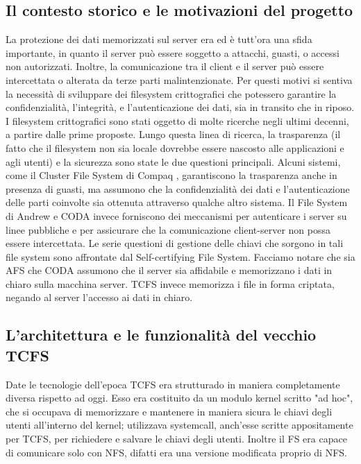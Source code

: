 \subsection{Il contesto storico e le motivazioni del progetto}
La protezione dei dati memorizzati sul server era ed è tutt'ora una sfida importante, in quanto il server può essere soggetto a attacchi, guasti, o accessi non autorizzati. Inoltre, la comunicazione tra il client e il server può essere intercettata o alterata da terze parti malintenzionate. Per questi motivi si sentiva la necessità di sviluppare dei filesystem crittografici che potessero garantire la confidenzialità, l’integrità, e l’autenticazione dei dati, sia in transito che in riposo. I filesystem crittografici sono stati oggetto di molte ricerche negli ultimi decenni, a partire dalle prime proposte. Lungo questa linea di ricerca, la trasparenza (il fatto che il filesystem non sia locale dovrebbe essere nascosto alle applicazioni e agli utenti) e la sicurezza sono state le due questioni principali.
Alcuni sistemi, come il Cluster File System di Compaq , garantiscono la trasparenza anche in presenza di guasti, ma assumono che la confidenzialità dei dati e l’autenticazione delle parti coinvolte sia ottenuta attraverso qualche altro sistema.
Il File System di Andrew e CODA invece forniscono dei meccanismi per autenticare i server su linee pubbliche e per assicurare che la comunicazione client-server non possa essere intercettata. Le serie questioni di gestione delle chiavi che sorgono in tali file system sono affrontate dal Self-certifying File System. Facciamo notare che sia AFS che CODA assumono che il server sia affidabile e memorizzano i dati in chiaro sulla macchina server. TCFS invece memorizza i file in forma criptata, negando al server l’accesso ai dati in chiaro.

\subsection{L’architettura e le funzionalità del vecchio TCFS}
Date le tecnologie dell'epoca TCFS era strutturado in maniera completamente diversa rispetto ad oggi. Esso era costituito da un modulo kernel scritto "ad hoc", che si occupava di memorizzare e mantenere in maniera sicura le chiavi degli utenti all'interno del kernel; utilizzava systemcall, anch'esse scritte appositamente per TCFS, per richiedere e salvare le chiavi degli utenti. Inoltre il FS era capace di comunicare solo con NFS, difatti era una versione modificata proprio di NFS.

